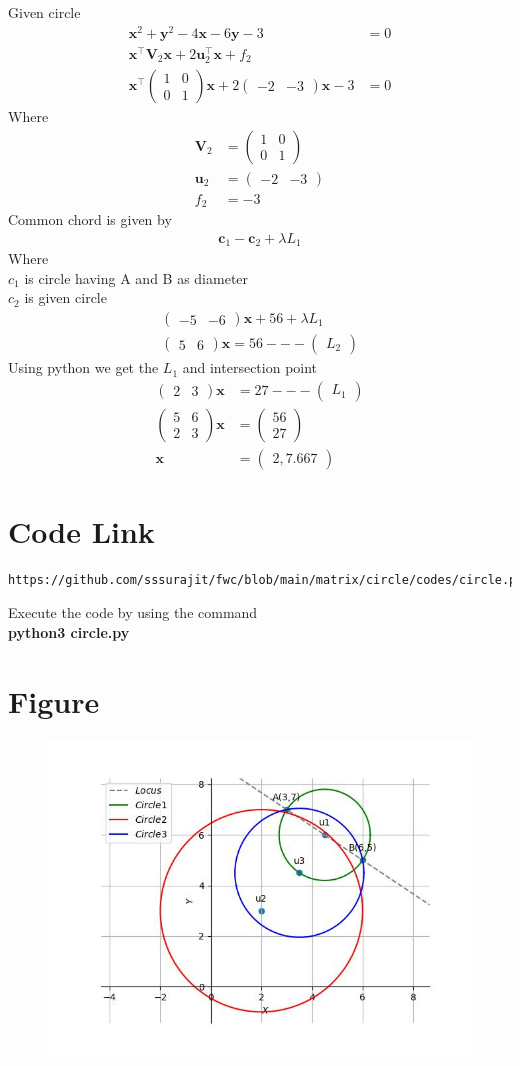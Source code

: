 \documentclass[journal,12pt,twocolumn]{IEEEtran}
\newcommand{\myvec}[1]{\ensuremath{\begin{pmatrix}#1\end{pmatrix}}}
\let\vec\mathbf
\begin{document}
Given circle
\begin{align}
    \vec{x}^2+\vec{y}^2-4\vec{x}-6\vec{y}-3&=0\\
    \vec{x}^{\top}\vec{V}_2\vec{x}+2\vec{u}_2^{\top}\vec{x}+f_2&\\
    \vec{x}^{\top}\myvec{1&0\\0&1}\vec{x}+2\myvec{-2&-3}\vec{x}-3&=0
\end{align}
Where
\begin{align}
    \vec{V}_2&=\myvec{1&0\\0&1}\\
    \vec{u}_2&=\myvec{-2&-3}\\
    f_2&={-3}
\end{align}
Common chord is given by
\begin{align}
    \vec{c}_1-\vec{c}_2+\lambda{L_1}
\end{align}
Where\\ $c_1$ is circle having A and B as diameter\\
        $c_2$ is given circle
\begin{align}
\myvec{-5&-6}\vec{x}+56+\lambda L_1\\
\myvec{5&6}\vec{x}=56---\myvec{L_2}
\end{align}
Using python we get the $L_1$ and intersection point
\begin{align}
    \myvec{2&3}\vec{x}&=27---\myvec{L_1}\\
    \myvec{5&6\\2&3}\vec{x}&=\myvec{56\\27}\\
    \vec{x}&=\myvec{2,7.667}
\end{align}
\section{\textbf{Code Link}}
\begin{lstlisting}
https://github.com/sssurajit/fwc/blob/main/matrix/circle/codes/circle.py
\end{lstlisting}
Execute the code by using the command
\\ \textbf{python3 circle.py}
\section{\textbf{Figure}}
\begin{figure}
    \centering
    \includegraphics[width=\columnwidth]{fig.jpg}
    \caption{}
    \label{fig}
\end{figure}
\end{document}
